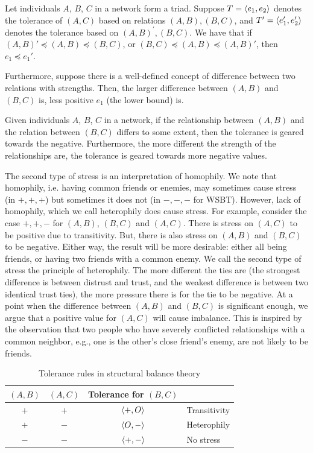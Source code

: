 \begin{principle}  
Let individuals $A$, $B$, $C$ in a network form a triad. Suppose
$T=\langle e_1,e_2\rangle$ denotes the tolerance of $(A,C)$ based on
relations $(A,B),(B,C)$, and $T'=\langle e_1',e_2'\rangle$ denotes the
tolerance based on $(A,B)^{'},(B,C)$. We have that if
$(A,B)' \preceq (A,B) \preceq (B,C)$, or $ (B,C) \preceq (A,B) \preceq
(A,B)'$, then $e_1\preceq e_1'$.

Furthermore, suppose there is a well-defined concept of difference
between two relations with strengths. Then, the larger difference
between $(A,B)$ and $(B,C)$ is, less positive $e_1$ (the lower bound)
is.
\end{principle}
Given individuals $A$, $B$, $C$ in a network, if the relationship
between $(A,B)$ and the relation between $(B,C)$ differs to some
extent, then the tolerance is geared towards the
negative. Furthermore, the more different the strength of the
relationships are, the tolerance is geared towards more
negative values. 

The second type of stress is an interpretation of homophily. We note
that homophily, i.e. having common friends or enemies, may sometimes
cause stress (in $+,+,+$) but sometimes it does not (in $-,-,-$ for
WSBT). However, lack of homophily, which we call heterophily does
cause stress. For example, consider the case $+,+,-$ for $(A,B)$,
$(B,C)$ and $(A,C)$. There is stress on $(A,C)$ to be positive due to
transitivity. But, there is also stress on $(A,B)$ and $(B,C)$ to be
negative. Either way, the result will be more desirable: either all
being friends, or having two friends with a common enemy. We call the
second type of stress the principle of heterophily. The more different
the ties are (the strongest difference is between distrust and trust,
and the weakest difference is between two identical trust ties), the
more pressure there is for the tie to be negative.  At a point when
the difference between $(A,B)$ and $(B,C)$ is significant enough, we
argue that a positive value for $(A,C)$ will cause imbalance. This is
inspired by the observation that two people who have severely
conflicted relationships with a common neighbor, e.g., one is the
other's close friend's enemy, are not likely to be friends.

\begin{table}[h]
\begin{center}
 \begin{tabular}{cc|cl} 
  $(A,B)$ & $(A,C)$ & Tolerance for $(B,C)$ &  \\ \hline
  $+$ & $+$ & $\langle +,O\rangle$ & Transitivity \\
  $+$ & $-$ & $\langle O,-\rangle$ & Heterophily \\ 
  $-$ & $-$ & $\langle +,-\rangle$ & No stress \\ 
 \end{tabular}\\  \vspace{1mm}
\caption{\label{ref:classic_balance}Tolerance rules in structural balance theory}
\end{center}
\end{table}

